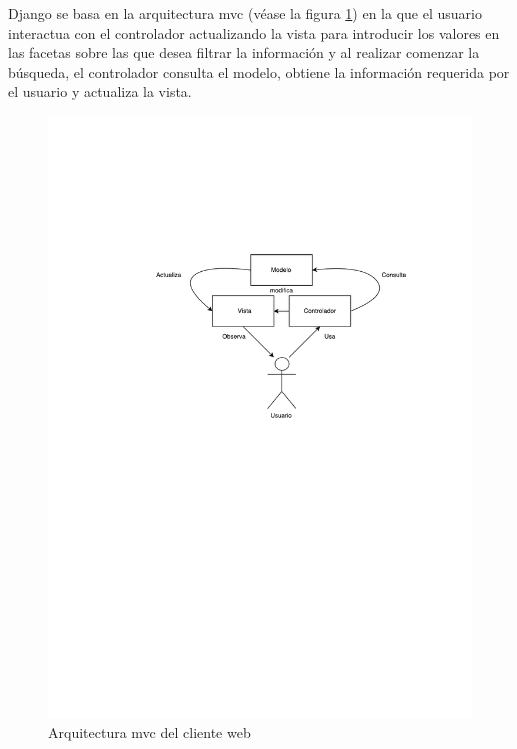 Django se basa en la arquitectura \acrshort{mvc} (véase la figura \ref{fig:mvc}) en la que el usuario interactua con el controlador actualizando la vista para introducir los valores en las facetas sobre las que desea filtrar la información y al realizar comenzar la búsqueda, el controlador consulta el modelo, obtiene la información requerida por el usuario y actualiza la vista.

\begin{figure}[!htbp]
	\centering
	\includegraphics[scale=0.6]{fig/mvc}
	\caption{Arquitectura \acrshort{mvc} del cliente web}
	\label{fig:mvc}
\end{figure}

